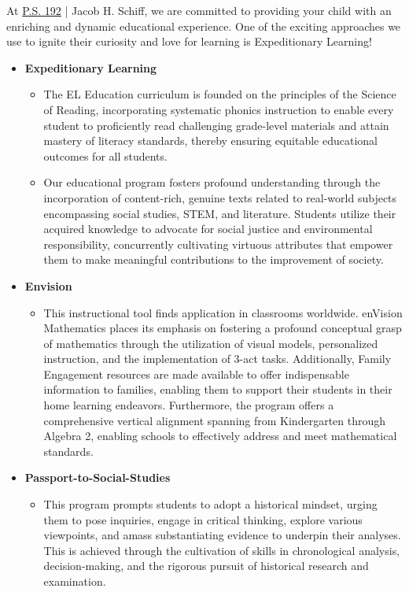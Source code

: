 \documentclass[11pt, letterpaper]{article}
\begin{document}
At \href{https://www.ps192.org}{P.S. 192} | Jacob H. Schiff, we are committed to providing your child with an enriching and dynamic educational experience. One of the exciting approaches we use to ignite their curiosity and love for learning is Expeditionary Learning!
\begin{itemize}
 \item \textbf{Expeditionary Learning}
\begin{itemize}
\item The EL Education curriculum is founded on the principles of the Science of Reading, incorporating systematic phonics instruction to enable every student to proficiently read challenging grade-level materials and attain mastery of literacy standards, thereby ensuring equitable educational outcomes for all students.
\item Our educational program fosters profound understanding through the incorporation of content-rich, genuine texts related to real-world subjects encompassing social studies, STEM, and literature. Students utilize their acquired knowledge to advocate for social justice and environmental responsibility, concurrently cultivating virtuous attributes that empower them to make meaningful contributions to the improvement of society.
\end{itemize}
\item \textbf{Envision}
\begin{itemize}
\item This instructional tool finds application in classrooms worldwide. enVision Mathematics places its emphasis on fostering a profound conceptual grasp of mathematics through the utilization of visual models, personalized instruction, and the implementation of 3-act tasks. Additionally, Family Engagement resources are made available to offer indispensable information to families, enabling them to support their students in their home learning endeavors. Furthermore, the program offers a comprehensive vertical alignment spanning from Kindergarten through Algebra 2, enabling schools to effectively address and meet mathematical standards.
\end{itemize}
\item \textbf{Passport-to-Social-Studies}
\begin{itemize}
\item This program prompts students to adopt a historical mindset, urging them to pose inquiries, engage in critical thinking, explore various viewpoints, and amass substantiating evidence to underpin their analyses. This is achieved through the cultivation of skills in chronological analysis, decision-making, and the rigorous pursuit of historical research and examination.

\end{itemize}
\end{itemize}
\end{document}

